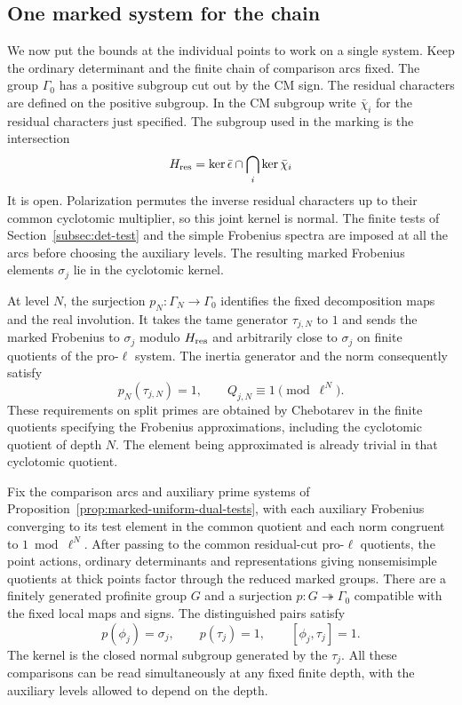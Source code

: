 \subsection{One marked system for the chain}
\label{sec:patching-marking}
\hypertarget{source-ordinary-patching-marking}{}

We now put the bounds at the individual points to work on a single system. Keep the
ordinary determinant and the finite chain of comparison arcs fixed. The group \(\Gamma_0\) has a positive subgroup cut out by
the CM sign. The residual characters are defined on the positive
subgroup.
In the CM subgroup write \(\bar\chi_i\) for the residual characters just specified. The subgroup used in the marking is the intersection
\[
 H_{\rm res}=\ker\bar\epsilon\cap\bigcap_i\ker\bar\chi_i
\] It is open.
Polarization permutes the inverse residual characters up to their
common cyclotomic multiplier, so this joint kernel is normal.
The finite tests of Section~\ref{subsec:det-test}
and the simple Frobenius spectra are imposed at all the arcs
before choosing the auxiliary levels. The resulting marked
Frobenius elements \(\sigma_j\) lie in the cyclotomic kernel.

At level \(N\), the surjection \(p_N:\Gamma_N\to\Gamma_0\)
identifies the fixed decomposition maps and the real involution.
It takes the tame generator \(\tau_{j,N}\) to \(1\)
and sends the marked Frobenius to \(\sigma_j\) modulo \(H_{\rm res}\)
and arbitrarily close to \(\sigma_j\) on finite quotients of
the pro-\(\ell\) system. The inertia generator and the norm consequently satisfy 
\[
 p_N(\tau_{j,N})=1,\qquad Q_{j,N}\equiv1\pmod{\ell^N}.
\]
 These requirements on split primes are
obtained by Chebotarev in the finite quotients specifying
the Frobenius approximations, including the cyclotomic quotient
of depth \(N\). The element being approximated is already
trivial in that cyclotomic quotient.

\begin{proposition}
\label{prop:marked-profinite-system}
Fix the comparison arcs and auxiliary prime systems of
Proposition~\ref{prop:marked-uniform-dual-tests}, with each
auxiliary Frobenius converging to its test element in the
common quotient and each norm congruent to \(1\bmod\ell^N\).
After passing to the common residual-cut pro-\(\ell\) quotients,
the point actions, ordinary determinants and representations giving
nonsemisimple quotients at thick points factor through the reduced marked groups. There are a finitely
generated profinite group \(G\) and a surjection
\(p:G\twoheadrightarrow\Gamma_0\) compatible with the fixed
local maps and signs. The distinguished pairs satisfy
\[
 p(\phi_j)=\sigma_j,\qquad
 p(\tau_j)=1,\qquad [\phi_j,\tau_j]=1.
\]
The kernel is the closed normal subgroup generated by the \(\tau_j\).
All these comparisons can be read simultaneously at any fixed finite
depth, with the auxiliary levels allowed to depend on the depth.
\end{proposition}

